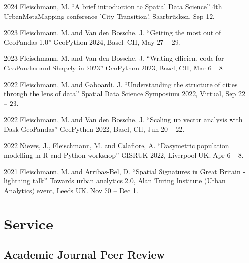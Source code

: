 \documentclass[12pt,a4paper]{report}
\begin{document}
    \begin{tablist}

        \item[2024] \tab{}Fleischmann, M. \enquote{A brief introduction to Spatial Data Science} 4th UrbanMetaMapping conference 'City Transition'. Saarbrücken. Sep 12.
        \item[2023] \tab{}Fleischmann, M. and Van den Bossche, J. \enquote{Getting the most out of GeoPandas 1.0} GeoPython 2024, Basel, CH, May 27 -- 29.
        \item[2023] \tab{}Fleischmann, M. and Van den Bossche, J. \enquote{Writing efficient code for GeoPandas and Shapely in 2023} GeoPython 2023, Basel, CH, Mar 6 -- 8.
        \item[2022] \tab{}Fleischmann, M. and Gaboardi, J. \enquote{Understanding the structure of cities through the lens of data} Spatial Data Science Symposium 2022, Virtual, Sep 22 -- 23.
        \item[2022] \tab{}Fleischmann, M. and Van den Bossche, J. \enquote{Scaling up vector analysis with Dask-GeoPandas} GeoPython 2022, Basel, CH, Jun 20 -- 22.
        \item[2022] \tab{}Nieves, J., Fleischmann, M. and Calafiore, A. \enquote{Dasymetric population modelling in R and Python workshop} GISRUK 2022, Liverpool UK. Apr 6 -- 8.
        \item[2021] \tab{}Fleischmann, M. and Arribas-Bel, D. \enquote{Spatial Signatures in Great Britain - lightning talk} Towards urban analytics 2.0, Alan Turing Institute (Urban Analytics) event, Leeds UK. Nov 30 -- Dec 1.

    \end{tablist}


    \section*{Service}

    \subsection*{Academic Journal Peer Review}
\end{document}
